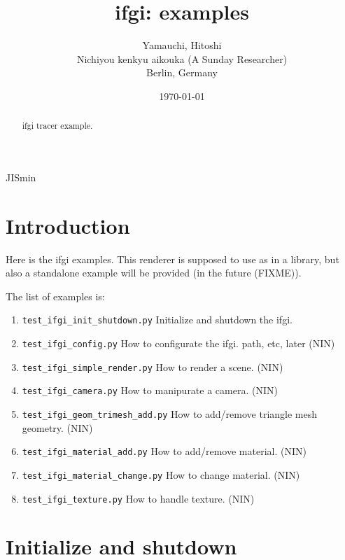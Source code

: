 \documentclass[12pt]{scrartcl}\usepackage{CJK}
\title{ifgi: examples}
\date{\today}
\author{Yamauchi, Hitoshi\\
Nichiyou kenkyu aikouka (A Sunday Researcher)\\
Berlin, Germany}
\begin{document}
\begin{CJK*}[dnp]{JIS}{min}

\maketitle

\def\vec#1{\mbox{\boldmath {$#1$}} }

\begin{abstract}
ifgi tracer example.
\end{abstract}

\section{Introduction}

Here is the ifgi examples. This renderer is supposed to use as in a
library, but also a standalone example will be provided (in the future
(FIXME)).

The list of examples is:
\begin{enumerate}
 \item \verb|test_ifgi_init_shutdown.py| Initialize and shutdown the
 ifgi.

 \item \verb|test_ifgi_config.py|
       How to configurate the ifgi. path, etc, later (NIN)

 \item \verb|test_ifgi_simple_render.py|
       How to render a scene. (NIN)

 \item \verb|test_ifgi_camera.py|
       How to manipurate a camera. (NIN)

 \item \verb|test_ifgi_geom_trimesh_add.py|
       How to add/remove triangle mesh geometry. (NIN)

 \item \verb|test_ifgi_material_add.py|
       How to add/remove material. (NIN)

 \item \verb|test_ifgi_material_change.py|
       How to change material. (NIN)

 \item \verb|test_ifgi_texture.py|
       How to handle texture. (NIN)
\end{enumerate}


\section{Initialize and shutdown}


\end{CJK*}
\end{document}

